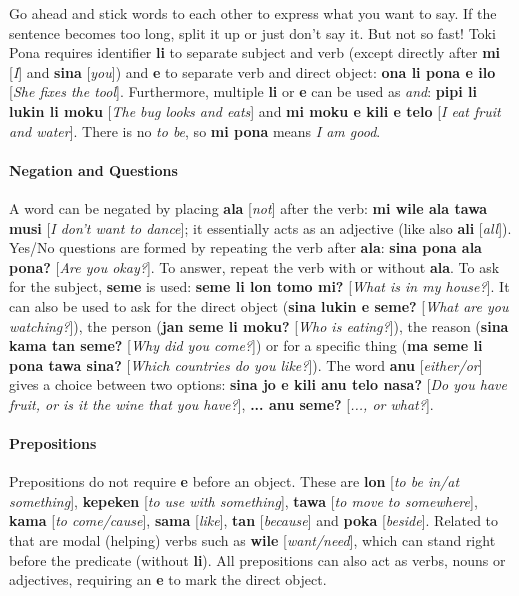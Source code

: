 \documentclass[10pt,a4paper]{article}
\begin{document}
\begin{multicols}{2}
Go ahead and stick words to each other to express what you want to say. If the sentence becomes too long, split it up or just don't say it. But not so fast! Toki Pona requires identifier \textbf{li} to separate subject and verb (except directly after \textbf{mi} [\textit{I}] and \textbf{sina} [\textit{you}]) and \textbf{e} to separate verb and direct object: \textbf{ona li pona e ilo} [\textit{She fixes the tool}]. Furthermore, multiple \textbf{li} or \textbf{e} can be used as \textit{and}: \textbf{pipi li lukin li moku} [\textit{The bug looks and eats}] and \textbf{mi moku e kili e telo} [\textit{I eat fruit and water}]. There is no \textit{to be}, so \textbf{mi pona} means \textit{I am good}.

\paragraph{Negation and Questions}

A word can be negated by placing \textbf{ala} [\textit{not}] after the verb: \textbf{mi wile ala tawa musi} [\textit{I don't want to dance}]; it essentially acts as an adjective (like also \textbf{ali} [\textit{all}]). Yes/No questions are formed by repeating the verb after \textbf{ala}: \textbf{sina pona ala pona?} [\textit{Are you okay?}]. To answer, repeat the verb with or without \textbf{ala}. To ask for the subject, \textbf{seme} is used: \textbf{seme li lon tomo mi?} [\textit{What is in my house?}]. It can also be used to ask for the direct object (\textbf{sina lukin e seme?} [\textit{What are you watching?}]), the person (\textbf{jan seme li moku?} [\textit{Who is eating?}]), the reason (\textbf{sina kama tan seme?} [\textit{Why did you come?}]) or for a specific thing (\textbf{ma seme li pona tawa sina?} [\textit{Which countries do you like?}]). The word \textbf{anu} [\textit{either/or}] gives a choice between two options: \textbf{sina jo e kili anu telo nasa?} [\textit{Do you have fruit, or is it the wine that you have?}], \textbf{... anu seme?} [\textit{..., or what?}].
\end{multicols}

\paragraph{Prepositions}

Prepositions do not require \textbf{e} before an object. These are \textbf{lon} [\textit{to be in/at something}], \textbf{kepeken} [\textit{to use with something}], \textbf{tawa} [\textit{to move to somewhere}], \textbf{kama} [\textit{to come/cause}], \textbf{sama} [\textit{like}], \textbf{tan} [\textit{because}] and \textbf{poka} [\textit{beside}]. Related to that are modal (helping) verbs such as \textbf{wile} [\textit{want/need}], which can stand right before the predicate (without \textbf{li}). All prepositions can also act as verbs, nouns or adjectives, requiring an \textbf{e} to mark the direct object.
\end{document}
